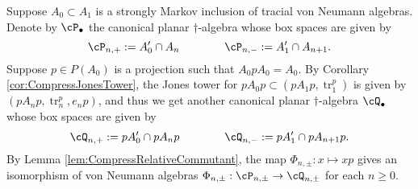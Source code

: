 \documentclass[11pt]{article}
\theoremstyle{plain}
\theoremstyle{definition}
\DeclareMathOperator{\tr}{tr}
\begin{document}

Suppose $A_0\subset A_1$ is a strongly Markov inclusion of tracial von Neumann algebras.
Denote by $\cP_\bullet$ the canonical planar $\dag$-algebra whose box spaces are given by
$$
\cP_{n,+}
:=
A_0'\cap A_n
\qquad\qquad
\cP_{n,-}
:=
A_1'\cap A_{n+1}.
$$
Suppose $p\in P(A_0)$ is a projection such that $A_0pA_0 = A_0$.
By Corollary \ref{cor:CompressJonesTower}, the Jones tower for $pA_0p \subset (pA_1p, \tr^p_1)$ is given by $(pA_np, \tr^p_n, e_np)$, and thus we get another canonical planar $\dag$-algebra $\cQ_\bullet$ whose box spaces are given by
$$
\cQ_{n,+}
:=
pA_0'\cap pA_np
\qquad\qquad
\cQ_{n,-}
:=
pA_1'\cap pA_{n+1}p.
$$
By Lemma \ref{lem:CompressRelativeCommutant}, the map $\Phi_{n,\pm}:x\mapsto xp$ gives an isomorphism of von Neumann algebras $\Phi_{n,\pm}:\cP_{n,\pm}\to \cQ_{n,\pm}$ for each $n\geq 0$.
\end{document}
